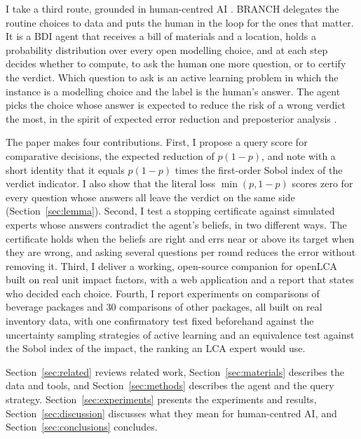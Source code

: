 \documentclass{article}
\begin{document}
I take a third route, grounded in human-centred AI \citep{shneiderman2022}. BRANCH delegates the
routine choices to data and puts the human in the loop for the ones that matter. It is a BDI agent
\citep{rao1995,wooldridge2009} that receives a bill of materials and a location, holds a probability
distribution over every open modelling choice, and at each step decides whether to compute, to ask the
human one more question, or to certify the verdict. Which question to ask is an active learning problem
\citep{settles2009} in which the instance is a modelling choice and the label is the human's answer. The
agent picks the choice whose answer is expected to reduce the risk of a wrong verdict the most, in the
spirit of expected error reduction \citep{roy2001} and preposterior analysis \citep{howard1966,raiffa1961}.

The paper makes four contributions. First, I propose a query score for comparative decisions, the
expected reduction of $p(1-p)$, and note with a short identity that it equals $p(1-p)$ times the
first-order Sobol index of the verdict indicator. I also show that the literal loss $\min(p,1-p)$ scores
zero for every question whose answers all leave the verdict on the same side (Section~\ref{sec:lemma}).
Second, I test a stopping certificate against simulated experts whose answers contradict the agent's
beliefs, in two different ways. The certificate holds when the beliefs are right and errs near or above
its target when they are wrong, and asking several questions per round reduces the error without removing
it. Third, I deliver a working, open-source companion for openLCA built on real unit impact factors, with
a web application and a report that states who decided each choice. Fourth, I report experiments on
\nCases{} comparisons of beverage packages and 30 comparisons of other packages, all built on real
inventory data, with one confirmatory test fixed beforehand against the uncertainty sampling strategies of
active learning \citep{settles2009,faria2022} and an equivalence test against the Sobol index of the
impact, the ranking an LCA expert would use.

Section~\ref{sec:related} reviews related work,
Section~\ref{sec:materials} describes the data and tools, and Section~\ref{sec:methods} describes the
agent and the query strategy. Section~\ref{sec:experiments} presents the experiments and results,
Section~\ref{sec:discussion} discusses what they mean for human-centred AI, and
Section~\ref{sec:conclusions} concludes.

\end{document}
